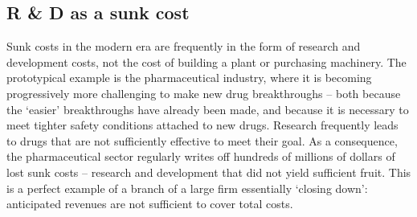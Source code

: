 \subsection*{R \& D as a sunk cost}

Sunk costs in the modern era are frequently in the form of research and development costs, not the cost of building a plant or purchasing machinery. The prototypical example is the pharmaceutical industry, where it is becoming progressively more challenging to make new drug breakthroughs -- both because the `easier' breakthroughs have already been made, and because it is necessary to meet tighter safety conditions attached to new drugs. Research frequently leads to drugs that are not sufficiently effective to meet their goal. As a consequence, the pharmaceutical sector regularly writes off hundreds of millions of dollars of lost sunk costs -- research and development that did not yield sufficient fruit. This is a perfect example of a branch of a large firm essentially `closing down': anticipated revenues are not sufficient to cover total costs.